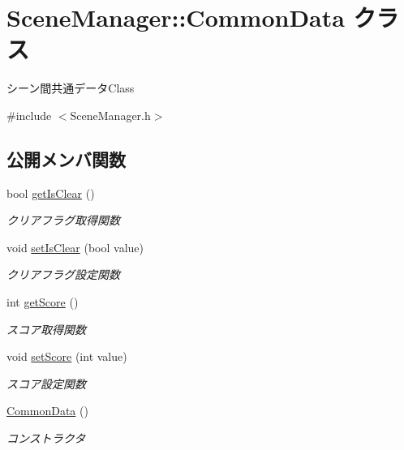 \hypertarget{class_scene_manager_1_1_common_data}{}\section{Scene\+Manager\+:\+:Common\+Data クラス}
\label{class_scene_manager_1_1_common_data}


シーン間共通データ\+Class  




{\ttfamily \#include $<$Scene\+Manager.\+h$>$}

\subsection*{公開メンバ関数}
\begin{DoxyCompactItemize}
\item 
bool \mbox{\hyperlink{class_scene_manager_1_1_common_data_a88aa3cc8dd3de9d2e10dc947ca06d397}{get\+Is\+Clear}} ()
\begin{DoxyCompactList}\small\item\em クリアフラグ取得関数 \end{DoxyCompactList}\item 
void \mbox{\hyperlink{class_scene_manager_1_1_common_data_a63ed55beac6b37243cafdbec26870fc3}{set\+Is\+Clear}} (bool value)
\begin{DoxyCompactList}\small\item\em クリアフラグ設定関数 \end{DoxyCompactList}\item 
int \mbox{\hyperlink{class_scene_manager_1_1_common_data_a46075a835d6fef5e1e00befc4ab6b2cd}{get\+Score}} ()
\begin{DoxyCompactList}\small\item\em スコア取得関数 \end{DoxyCompactList}\item 
void \mbox{\hyperlink{class_scene_manager_1_1_common_data_a8c30ea362a57f01cdbd667a2224b8af3}{set\+Score}} (int value)
\begin{DoxyCompactList}\small\item\em スコア設定関数 \end{DoxyCompactList}\item 
\mbox{\hyperlink{class_scene_manager_1_1_common_data_a0dca4788d1d0eec89c18b29f3c4ca678}{Common\+Data}} ()
\begin{DoxyCompactList}\small\item\em コンストラクタ \end{DoxyCompactList}\item 

\end{DoxyCompactItemize}

